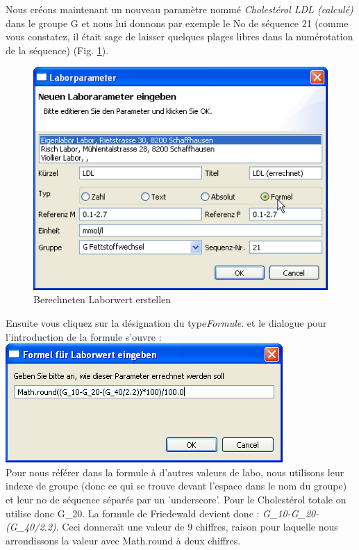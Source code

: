 Nous créons maintenant un nouveau paramètre nommé  \textit{Cholestérol LDL (calculé)} dans le groupe G et nous lui donnons par exemple le No de séquence 21 (comme vous constatez, il était sage de laisser quelques plages libres dans la numérotation de la séquence)  (Fig. \ref{fig:labor2}).
\begin{figure}[htp]
\begin{center}
  \includegraphics{images/labor2}
  \caption{Berechneten Laborwert erstellen}
  \label{fig:labor2}
\end{center}
\end{figure}
 Ensuite vous cliquez sur la désignation du type\textit{Formule}. et le dialogue pour l'introduction de la formule s'ouvre :\\
 \includegraphics{images/labor3}\\
Pour nous référer dans la formule à d'autres valeurs de labo, nous utilisons leur indexe de groupe (donc ce qui se trouve devant l'espace dans le nom du groupe) et leur no de séquence séparés par un 'underscore'.  Pour le Cholestérol totale on utilise donc G\_20. La formule de Friedewald devient donc : \textit{G\_10-G\_20-(G\_40/2.2)}. Ceci donnerait une valeur de 9 chiffres, raison pour laquelle nous arrondissons la valeur avec Math.round à deux chiffres.

